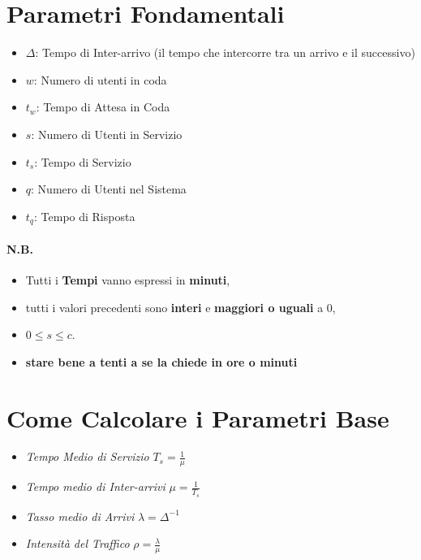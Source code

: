 \section{Parametri Fondamentali}

\begin{itemize}
    \item $\Delta$: Tempo di Inter-arrivo (il tempo che intercorre tra un arrivo
          e il successivo)
    \item $w$: Numero di utenti in coda
    \item $t_w$: Tempo di Attesa in Coda
    \item $s$: Numero di Utenti in Servizio
    \item $t_s$: Tempo di Servizio
    \item $q$: Numero di Utenti nel Sistema
    \item $t_q$: Tempo di Risposta
\end{itemize}

\paragraph{N.B.}
\begin{itemize}
    \item Tutti i \textbf{Tempi} vanno espressi in \textbf{minuti},
    \item tutti i valori precedenti sono \textbf{interi} e \textbf{maggiori o
              uguali} a 0,
    \item $0 \leq s \leq c$.
    \item \textbf{stare bene a tenti a se la chiede in ore o minuti }
\end{itemize}

\section{Come Calcolare i Parametri Base} \label{parametri-base}

\begin{itemize}
    \item \textit{Tempo Medio di Servizio} $T_s = \frac{1}{\mu}$
    \item \textit{Tempo medio di Inter-arrivi} $\mu = \frac{1}{T_s}$
    \item \textit{Tasso medio di Arrivi} $\lambda = \Delta^{-1}$
    \item \textit{Intensità del Traffico} $\rho = \frac{\lambda}{\mu}$
\end{itemize}

